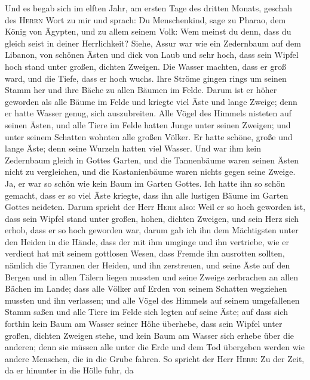  Und es begab sich im elften Jahr, am ersten Tage des
dritten Monats, geschah des \textsc{Herrn} Wort zu mir und sprach:
 Du Menschenkind, sage zu Pharao, dem König von Ägypten,
und zu allem seinem Volk: Wem meinst du denn, dass du gleich seist in
deiner Herrlichkeit?  Siehe, Assur war wie ein Zedernbaum
auf dem Libanon, von schönen Ästen und dick von Laub und sehr hoch, dass
sein Wipfel hoch stand unter großen, dichten Zweigen.  Die
Wasser machten, dass er groß ward, und die Tiefe, dass er hoch wuchs.
Ihre Ströme gingen rings um seinen Stamm her und ihre Bäche zu allen
Bäumen im Felde.  Darum ist er höher geworden als alle
Bäume im Felde und kriegte viel Äste und lange Zweige; denn er hatte
Wasser genug, sich auszubreiten.  Alle Vögel des Himmels
nisteten auf seinen Ästen, und alle Tiere im Felde hatten Junge unter
seinen Zweigen; und unter seinem Schatten wohnten alle großen Völker.
 Er hatte schöne, große und lange Äste; denn seine Wurzeln
hatten viel Wasser.  Und war ihm kein Zedernbaum gleich in
Gottes Garten, und die Tannenbäume waren seinen Ästen nicht zu
vergleichen, und die Kastanienbäume waren nichts gegen seine Zweige. Ja,
er war so schön wie kein Baum im Garten Gottes.  Ich hatte
ihn so schön gemacht, dass er so viel Äste kriegte, dass ihn alle
lustigen Bäume im Garten Gottes neideten.  Darum spricht
der Herr \textsc{Herr} also: Weil er so hoch geworden ist, dass sein
Wipfel stand unter großen, hohen, dichten Zweigen, und sein Herz sich
erhob, dass er so hoch geworden war,  darum gab ich ihn
dem Mächtigsten unter den Heiden in die Hände, dass der mit ihm umginge
und ihn vertriebe, wie er verdient hat mit seinem gottlosen Wesen,
 dass Fremde ihn ausrotten sollten, nämlich die Tyrannen
der Heiden, und ihn zerstreuen, und seine Äste auf den Bergen und in
allen Tälern liegen mussten und seine Zweige zerbrachen an allen Bächen
im Lande; dass alle Völker auf Erden von seinem Schatten wegziehen
mussten und ihn verlassen;  und alle Vögel des Himmels
auf seinem umgefallenen Stamm saßen und alle Tiere im Felde sich legten
auf seine Äste;  auf dass sich forthin kein Baum am
Wasser seiner Höhe überhebe, dass sein Wipfel unter großen, dichten
Zweigen stehe, und kein Baum am Wasser sich erhebe über die anderen;
denn sie müssen alle unter die Erde und dem Tod übergeben werden wie
andere Menschen, die in die Grube fahren.  So spricht der
Herr \textsc{Herr}: Zu der Zeit, da er hinunter in die Hölle fuhr, da

